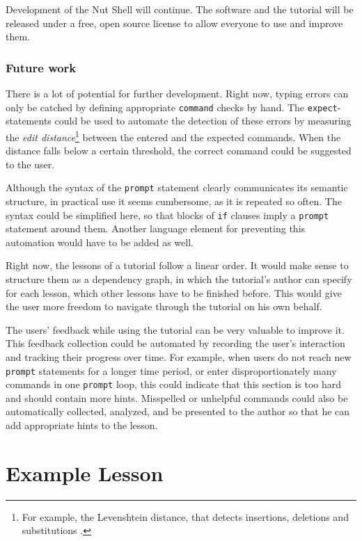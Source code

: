 \documentclass[paper=a4,twoside,abstract=on,cleardoublepage=empty,numbers=noenddot,toc=bib,toc=listof,12pt,appendixprefix=true]{scrreprt}
\begin{document}
Development of the Nut Shell will continue. The software and the tutorial will be released under a free, open source license to allow everyone to use and improve them.

\subsection*{Future work}

There is a lot of potential for further development. Right now, typing errors can only be catched by defining appropriate \texttt{command} checks by hand. The \texttt{expect}-statements could be used to automate the detection of these errors by measuring the \emph{edit distance}\footnote{For example, the Levenshtein distance, that detects insertions, deletions and substitutions \cite{levenshtein66}.} between the entered and the expected commands. When the distance falls below a certain threshold, the correct command could be suggested to the user.

Although the syntax of the \texttt{prompt} statement clearly communicates its semantic structure, in practical use it seems cumbersome, as it is repeated so often. The syntax could be simplified here, so that blocks of \texttt{if} clauses imply a \texttt{prompt} statement around them. Another language element for preventing this automation would have to be added as well.

Right now, the lessons of a tutorial follow a linear order. It would make sense to structure them as a dependency graph, in which the tutorial's author can specify for each lesson, which other lessons have to be finished before. This would give the user more freedom to navigate through the tutorial on his own behalf.

The users' feedback while using the tutorial can be very valuable to improve it. This feedback collection could be automated by recording the user's interaction and tracking their progress over time. For example, when users do not reach new \texttt{prompt} statements for a longer time period, or enter disproportionately many commands in one \texttt{prompt} loop, this could indicate that this section is too hard and should contain more hints. Misspelled or unhelpful commands could also be automatically collected, analyzed, and be presented to the author so that he can add appropriate hints to the lesson.

\appendix

\chapter{Example Lesson}
\label{sec:nutshexample}
\end{document}

